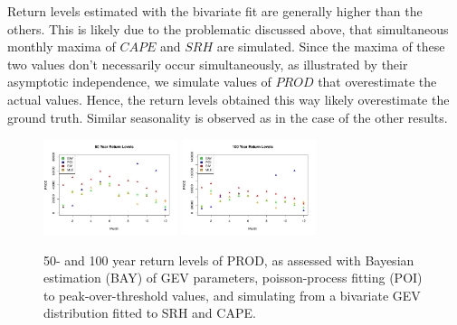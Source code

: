 \documentclass[10pt,conference,compsocconf]{IEEEtran}
\begin{document}
\par
Return levels estimated with the bivariate fit are generally higher than the others. This is likely due to the problematic discussed above, that simultaneous monthly maxima of $CAPE$ and $SRH$ are simulated. Since the maxima of these two values don't necessarily occur simultaneously, as illustrated by their asymptotic independence, we simulate values of $PROD$ that overestimate the actual values. Hence, the return levels obtained this way likely overestimate the ground truth. Similar seasonality is observed as in the case of the other results. 
\par

\begin{figure}
	\centering
	\includegraphics[width=0.35\textwidth]{../plots/50yr_return.pdf}
	\includegraphics[width=0.35\textwidth]{../plots/100yr_return.pdf}
	\caption{50- and 100 year return levels of PROD, as assessed with Bayesian estimation (BAY) of GEV parameters, poisson-process fitting (POI) to peak-over-threshold values, and simulating from a bivariate GEV distribution fitted to SRH and CAPE.}
	\label{fig:return_lvl}
\end{figure}
\end{document}
